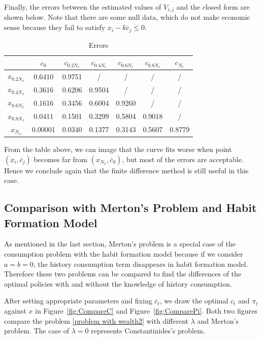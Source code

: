 \documentclass[a4paper]{article}
\theoremstyle{definition}
\numberwithin{equation}{section}
\begin{document}
Finally, the errors between the estimated values of $V_{i,j}$ and the closed form are shown below. Note that there are some null data, which do not make economic sense because they fail to satisfy $x_i-k\overline c_j\leq0$.
\begin{table}[H]
\centering
\begin{tabular}{c|cccccc }
\hline
& $c_0$ & $c_{0.2N_c}$ & $c_{0.4N_c}$ & $c_{0.6N_c}$ & $c_{0.8N_c}$ & $c_{N_c}$\\
\hline			
$x_{0.2N_x}$ & 0.6410 & 0.9751 & / & / & / & / \\
$x_{0.4N_x}$ & 0.3616 & 0.6206 & 0.9504 & / & / & / \\
$x_{0.6N_x}$ & 0.1616 & 0.3456 & 0.6004 & 0.9260 & / & / \\
$x_{0.8N_x}$ & 0.0411 & 0.1501 & 0.3299 & 0.5804 & 0.9018 & / \\
$x_{N_x}$ & 0.00001 & 0.0340 & 0.1377 & 0.3143 & 0.5607 & 0.8779 \\
\hline  
\end{tabular}
\caption{Errors}
\end{table}
From the table above, we can image that the curve fits worse when point $(x_i,\overline c_j)$ becomes far from $(x_{N_x},\overline c_0)$, but most of the errors are acceptable. Hence we conclude again that the finite difference method is still useful in this case.

\subsection{Comparison with Merton's Problem and Habit Formation Model}
As mentioned in the last section, Merton's problem is a special case of the consumption problem with the habit formation model because if we consider $a=b=0$, the history consumption term disappears in habit formation model. Therefore these two problems can be compared to find the differences of the optimal policies with and without the knowledge of history consumption.

After setting appropriate parameters and fixing $\overline c_t$, we draw the optimal $c_t$ and $\pi_t$ against $x$ in Figure~\ref{fig:CompareC} and Figure~\ref{fig:ComparePi}. Both two figures compare the problem \eqref{problem with wealth2} with different $\lambda$ and Merton's problem. The case of $\lambda=0$ represents Constantinides's problem.
\end{document}
